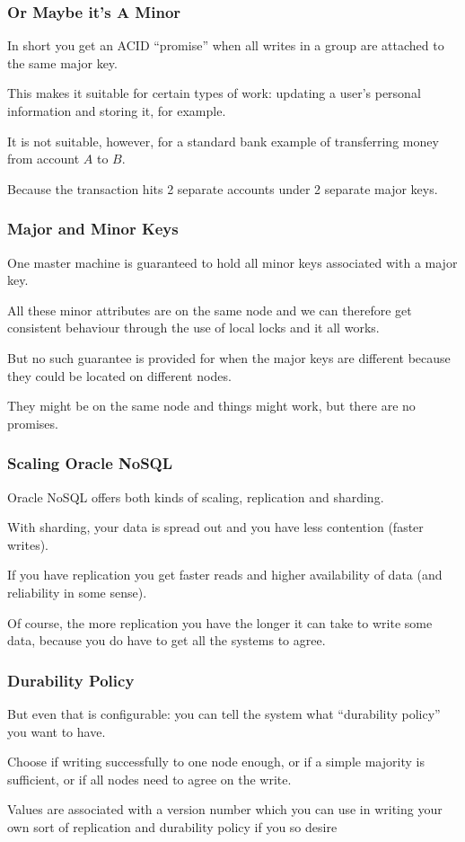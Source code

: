 \begin{frame}
\frametitle{Or Maybe it's A Minor}

In short you get an ACID ``promise'' when all writes in a group are attached to the same major key. 

This makes it suitable for certain types of work: updating a user's personal information and storing it, for example. 

It is not suitable, however, for a standard bank example of transferring money from account $A$ to $B$. 

Because the transaction hits 2 separate accounts under 2 separate major keys. 

\end{frame}



\begin{frame}
\frametitle{Major and Minor Keys}

One master machine is guaranteed to hold all minor keys associated with a major key.

All these minor attributes are on the same node and we can therefore get consistent behaviour through the use of local locks and it all works. 
 
But no such guarantee is provided for when the major keys are different because they could be located on different nodes. 
 
They might be on the same node and things might work, but there are no promises. 

\end{frame}



\begin{frame}
\frametitle{Scaling Oracle NoSQL}

Oracle NoSQL offers both kinds of scaling, replication and sharding. 

With sharding, your data is spread out and you have less contention (faster writes). 

If you have replication you get faster reads and higher availability of data (and reliability in some sense). 

Of course, the more replication you have the longer it can take to write some data, because you do have to get all the systems to agree. 

\end{frame}



\begin{frame}
\frametitle{Durability Policy}

But even that is configurable: you can tell the system what ``durability policy'' you want to have. 

Choose if writing successfully to one node enough, or if a simple majority is sufficient, or if all nodes need to agree on the write. 

Values are associated with a version number which you can use in writing your own sort of replication and durability policy if you so desire

\end{frame}



